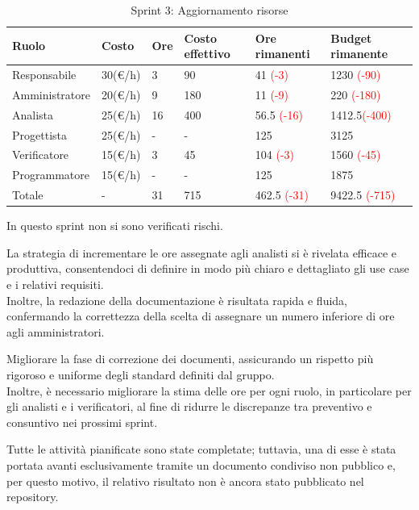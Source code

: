 
\begin{table}[H]
	\centering
	\begin{tabular}{|p{}|p{}|p{}|p{}|p{}|p{}|}
		\hline
		\rowcolor{gray!25}
		Ruolo & Costo & Ore & Costo \newline effettivo & Ore \newline rimanenti & Budget \newline rimanente \\ \hline
		Responsabile   & 30(€/h) & 3 & 90 & 41 \textcolor{red}{(-3)} & 1230 \textcolor{red}{(-90)} \\ \hline
		Amministratore & 20(€/h) & 9 & 180 & 11 \textcolor{red}{(-9)} & 220 \textcolor{red}{(-180)} \\ \hline
		Analista       & 25(€/h) & 16 & 400 & 56.5 \textcolor{red}{(-16)} & 1412.5\textcolor{red}{(-400)} \\ \hline
		Progettista    & 25(€/h) & - & - & 125 & 3125 \\ \hline
		Verificatore   & 15(€/h) & 3 & 45 & 104 \textcolor{red}{(-3)} & 1560 \textcolor{red}{(-45)} \\ \hline
		Programmatore  & 15(€/h) & - & - & 125 & 1875 \\ \hline
		Totale         & - & 31 & 715 & 462.5 \textcolor{red}{(-31)} & 9422.5 \textcolor{red}{(-715)} \\ \hline
	\end{tabular}
	\caption{Sprint 3: Aggiornamento risorse}
\end{table}

In questo sprint non si sono verificati rischi.

La strategia di incrementare le ore assegnate agli analisti si è rivelata efficace e produttiva, consentendoci di definire in modo più chiaro e dettagliato gli use case e i relativi requisiti.\\
Inoltre, la redazione della documentazione è risultata rapida e fluida, confermando la correttezza della scelta di assegnare un numero inferiore di ore agli amministratori.

Migliorare la fase di correzione dei documenti, assicurando un rispetto più rigoroso e uniforme degli standard definiti dal gruppo.\\
Inoltre, è necessario migliorare la stima delle ore per ogni ruolo, in particolare per gli analisti e i verificatori, al fine di ridurre le discrepanze tra preventivo e consuntivo nei prossimi sprint.

Tutte le attività pianificate sono state completate; tuttavia, una di esse è stata portata avanti esclusivamente tramite un documento condiviso non pubblico e, per questo motivo, il relativo risultato non è ancora stato pubblicato nel repository.